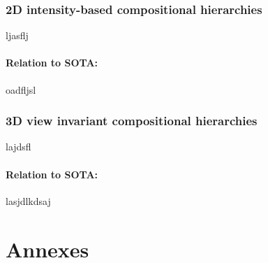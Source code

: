 \documentclass[a4paper,11pt,pdf]{../templates/pacmanreport}
\begin{document}
\subsubsection{2D intensity-based compositional hierarchies}

ljasflj

\paragraph{Relation to SOTA:} oadfljsl

\subsubsection{3D view invariant compositional hierarchies}

lajdsfl

\paragraph{Relation to SOTA:} lasjdlkdsaj 






\newpage

\appendix
\section{Annexes}


\end{document}
